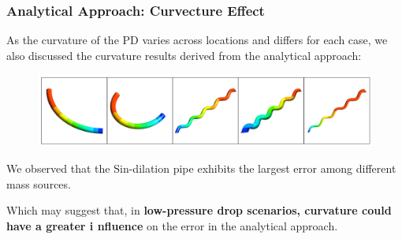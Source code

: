 \documentclass{beamer}
\begin{document}
\begin{frame}
    \fontsize{8pt}{10pt}\selectfont
    \frametitle{Analytical Approach: Curvecture Effect}

    As the curvature of the PD varies across 
    locations and differs for each case, 
    we also discussed the curvature results 
    derived from the analytical approach:

    \begin{figure}[H]
        \centering
        \includegraphics[width=\textwidth]{figures/Curvature.jpg}
    \end{figure}

    \begin{table}[H]
        \centering
        \label{tab:error-percentages-transposed}
        \end{table}

        We observed that the Sin-dilation pipe 
        exhibits the largest error among different
         mass sources. 


         \vspace{0.02\textwidth}
         
         
         Which may suggest that, in \textbf{low-pressure drop 
         scenarios, curvature could have a greater i
         nfluence} on the error in the analytical approach.
    


    
\end{frame}
\end{document}
